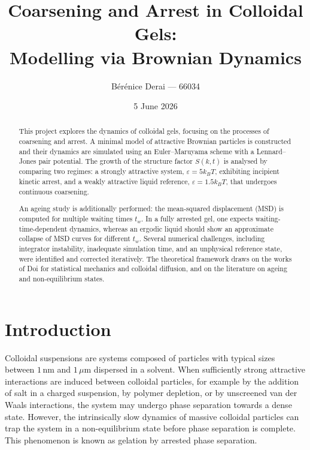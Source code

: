 \documentclass[11pt,a4paper]{article}
\title{\textbf{Coarsening and Arrest in Colloidal Gels:}\\
Modelling via Brownian Dynamics}
\author{B\'er\'enice Derai --- 66034}
\date{5 June 2026}
\begin{document}
\maketitle

\begin{abstract}
This project explores the dynamics of colloidal gels, focusing on the processes of coarsening and arrest. A minimal model of attractive Brownian particles is constructed and their dynamics are simulated using an Euler--Maruyama scheme with a Lennard--Jones pair potential. The growth of the structure factor $S(k,t)$ is analysed by comparing two regimes: a strongly attractive system, $\varepsilon = 5 k_B T$, exhibiting incipient kinetic arrest, and a weakly attractive liquid reference, $\varepsilon = 1.5 k_B T$, that undergoes continuous coarsening.

An ageing study is additionally performed: the mean-squared displacement (MSD) is computed for multiple waiting times $t_w$. In a fully arrested gel, one expects waiting-time-dependent dynamics, whereas an ergodic liquid should show an approximate collapse of MSD curves for different $t_w$. Several numerical challenges, including integrator instability, inadequate simulation time, and an unphysical reference state, were identified and corrected iteratively. The theoretical framework draws on the works of Doi for statistical mechanics and colloidal diffusion, and on the literature on ageing and non-equilibrium states.
\end{abstract}

\tableofcontents
\newpage

\section{Introduction}

Colloidal suspensions are systems composed of particles with typical sizes between $1\,\mathrm{nm}$ and $1\,\mu\mathrm{m}$ dispersed in a solvent.  When sufficiently strong attractive interactions are induced between colloidal particles, for example by the addition of salt in a charged suspension, by polymer depletion, or by unscreened van der Waals interactions, the system may undergo phase separation towards a dense state. However, the intrinsically slow dynamics of massive colloidal particles can trap the system in a non-equilibrium state before phase separation is complete. This phenomenon is known as gelation by arrested phase separation.
\end{document}
